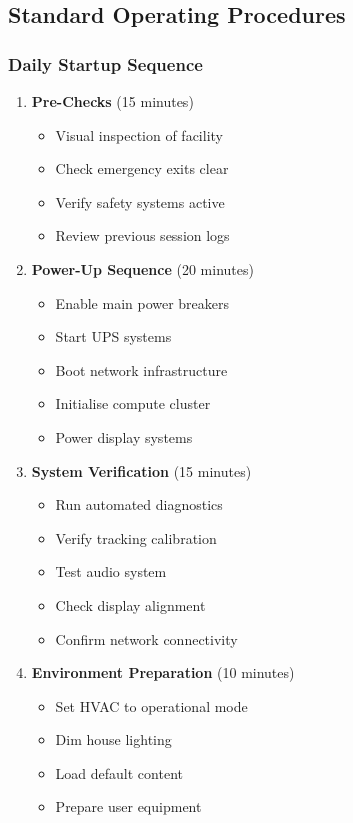 \subsection{Standard Operating Procedures}

\subsubsection{Daily Startup Sequence}

\begin{enumerate}
    \item \textbf{Pre-Checks} (15 minutes)
        \begin{itemize}
            \item Visual inspection of facility
            \item Check emergency exits clear
            \item Verify safety systems active
            \item Review previous session logs
        \end{itemize}

    \item \textbf{Power-Up Sequence} (20 minutes)
        \begin{itemize}
            \item Enable main power breakers
            \item Start UPS systems
            \item Boot network infrastructure
            \item Initialise compute cluster
            \item Power display systems
        \end{itemize}

    \item \textbf{System Verification} (15 minutes)
        \begin{itemize}
            \item Run automated diagnostics
            \item Verify tracking calibration
            \item Test audio system
            \item Check display alignment
            \item Confirm network connectivity
        \end{itemize}

    \item \textbf{Environment Preparation} (10 minutes)
        \begin{itemize}
            \item Set HVAC to operational mode
            \item Dim house lighting
            \item Load default content
            \item Prepare user equipment
        \end{itemize}
\end{enumerate}

